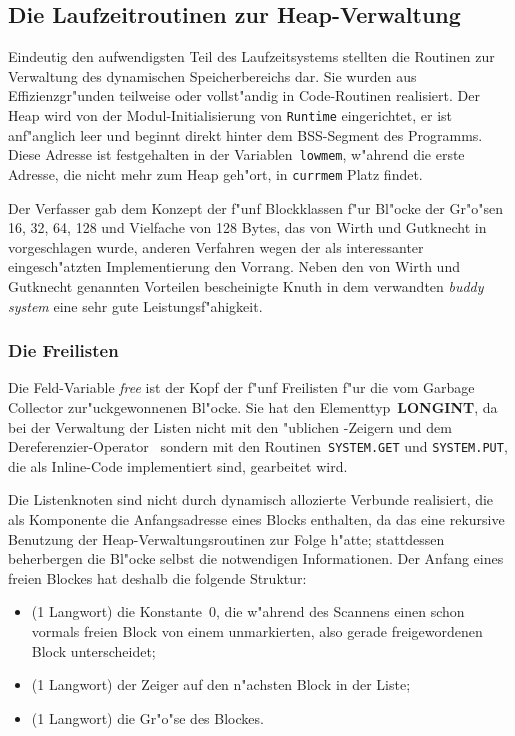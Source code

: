 \subsection{Die Laufzeitroutinen zur Heap-Verwaltung}

Eindeutig den aufwendigsten Teil des Laufzeitsystems stellten die Routinen
zur Verwaltung des dynamischen Speicherbereichs dar.
Sie wurden aus Effizienzgr"unden teilweise oder vollst"andig in Code-Routinen
realisiert.
Der Heap wird von der Modul-Initialisierung von {\tt Runtime} eingerichtet,
er ist anf"anglich leer und beginnt direkt hinter dem BSS-Segment des
Programms.
Diese Adresse ist festgehalten in der Variablen~{\tt lowmem}, w"ahrend die
erste Adresse, die nicht mehr zum Heap geh"ort, in {\tt currmem} Platz
findet.

\medskip
Der Verfasser gab dem Konzept der f"unf Blockklassen f"ur Bl"ocke der
Gr"o"sen 16, 32, 64, 128 und Vielfache von 128 Bytes, das von Wirth und
Gutknecht in \cite[S. 871]{oberonSystem} vorgeschlagen wurde, anderen
Verfahren wegen der als interessanter eingesch"atzten Implementierung
den Vorrang.
Neben den von Wirth und Gutknecht genannten Vorteilen bescheinigte
Knuth in \cite[S.~448]{artProgramming} dem verwandten {\it buddy system\/}
eine sehr gute Leistungsf"ahigkeit.

\subsubsection{Die Freilisten}
\label{Freilisten}

Die Feld-Variable {\it free\/} ist der Kopf der f"unf Freilisten
f"ur die vom Garbage Collector zur"uckgewonnenen Bl"ocke.
Sie hat den Elementtyp~{\bf LONGINT}, da bei der Verwaltung der Listen
nicht mit den "ublichen \oberon-Zeigern und dem Dereferenzier-Operator
\caret\ sondern mit den Routinen~{\tt SYSTEM.GET} und {\tt SYSTEM.PUT},
die als Inline-Code implementiert sind, gearbeitet wird.

Die Listenknoten sind nicht durch dynamisch allozierte Verbunde realisiert,
die als Komponente die Anfangsadresse eines Blocks enthalten, da das eine
rekursive Benutzung der Heap-Ver\-wal\-tungs\-rou\-tinen zur Folge h"atte;
stattdessen beherbergen die Bl"ocke selbst die notwendigen Informationen.
Der Anfang eines freien Blockes hat deshalb die folgende Struktur:
\begin{itemize}
\item (1 Langwort) die Konstante~0, die w"ahrend des Scannens einen schon
  vormals freien Block von einem unmarkierten, also gerade freigewordenen
  Block unterscheidet;
\item (1 Langwort) der Zeiger auf den n"achsten Block in der Liste;
\item (1 Langwort) die Gr"o"se des Blockes.
\end{itemize}


